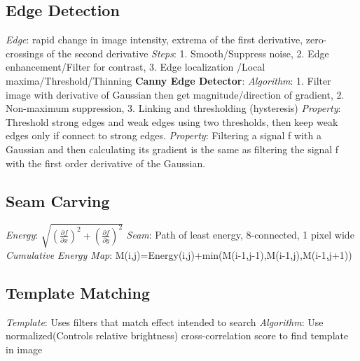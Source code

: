 \documentclass{article}
\begin{document}
\begin{multicols*}{2}
        \subsection*{Edge Detection}
        \textit{Edge}: rapid change in image intensity, extrema of the first derivative, zero-crossings of the second
        derivative\newline
        \textit{Steps}: 1. Smooth/Suppress noise, 2. Edge enhancement/Filter for contrast, 3. Edge localization
        /Local maxima/Threshold/Thinning\newline
        \textbf{Canny Edge Detector}:\newline
        \textit{Algorithm}: 1. Filter image with derivative of Gaussian then get
        magnitude/direction of gradient, 2. Non-maximum suppression, 3. Linking and thresholding (hysteresis)\newline
        \textit{Property}: Threshold strong edges and weak edges using two thresholds, then keep weak edges only if
        connect to strong edges.\newline
        \textit{Property}: Filtering a signal f with a Gaussian and then calculating its gradient is the same as
        filtering the signal f with the first order derivative of the Gaussian.\newline
        \subsection*{Seam Carving}
        \textit{Energy}: $\sqrt {\left(\frac{\partial f}{\partial x}\right)^2 +
        \left(\frac{\partial f}{\partial y}\right)^2}$\newline
        \textit{Seam}: Path of least energy, 8-connected, 1 pixel wide\newline
        \textit{Cumulative Energy Map}: M(i,j)=Energy(i,j)+min(M(i-1,j-1),M(i-1,j),M(i-1,j+1))\newline
        \subsection*{Template Matching}
        \textit{Template}: Uses filters that match effect intended to search\newline
        \textit{Algorithm}: Use normalized(Controls relative brightness) cross-correlation score to find template in
        image\newline

\end{multicols*}
\end{document}
